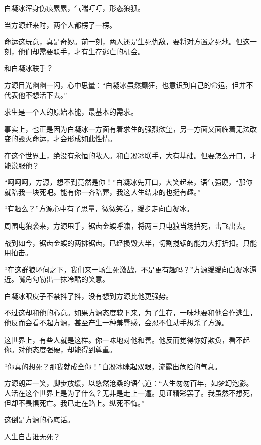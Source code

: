 
\begin{this_body}

白凝冰浑身伤痕累累，气喘吁吁，形态狼狈。

当方源赶来时，两个人都楞了一楞。

命运这玩意，真是奇妙。前一刻，两人还是生死仇敌，要将对方置之死地。但这一刻，他们却需要联手，才有生存逃亡的机会。

和白凝冰联手？

方源目光幽幽一闪，心中思量：“白凝冰虽然癫狂，也意识到自己的命运，但并不代表他不想活下去。”

求生是一个人的原始本能，最基本的需求。

事实上，也正是因为白凝冰一方面有着求生的强烈欲望，另一方面又面临着无法改变的毁灭命运，才会形成如此性情。

在这个世界上，绝没有永恒的敌人。和白凝冰联手，大有基础。但要怎么开口，才能说服他？

“呵呵呵，方源，想不到竟然是你！”白凝冰先开口，大笑起来，语气强硬，“那你就陪我一块死吧。能有你一齐陪葬，我这人生结束的也挺有趣。”

“有趣么？”方源心中有了思量，微微笑着，缓步走向白凝冰。

周围电狼袭来，方源甩手，锯齿金蜈呼啸，将两三只电狼当场拍死，击飞出去。

战到如今，锯齿金蜈的两排锯齿，已经损毁大半，切割搅锯的能力大打折扣。只能用拍击。

“在这群狼环伺之下，我们来一场生死激战，不是更有趣吗？”方源缓缓向白凝冰逼近。嘴角勾勒出一抹冷酷的笑意。

白凝冰眼皮子不禁抖了抖，没有想到方源比他更强势。

不过这却和他的心意。如果方源态度软下来，为了生存，一味地要和他合作逃生，他反而会看不起方源，甚至产生一种羞辱感，会忍不住动手想杀了方源。

这世界上，有些人就是这样。你一味地对他和善。他反而觉得你好欺负，看不起你。对他态度强硬，却能得到尊重。

“你真的想死？那我就成全你！”白凝冰眯起双眼，流露出危险的气息。

方源朗声一笑，脚步放缓，以悠然沧桑的语气道：“人生匆匆百年，如梦幻泡影。人活在这个世界上是为了什么？无非是走上一遭。见证精彩罢了。我虽然不想死，但却不畏惧死亡。我已走在路上。纵死不悔。”

这倒是方源的心底话。

人生自古谁无死？


\end{this_body}
